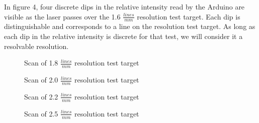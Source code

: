 \documentclass[letterpaper, 12pt]{article}
\begin{document}
\par
In figure 4, four discrete dips in the relative intensity read by the Arduino are visible as the laser passes over the 1.6 $\frac{lines}{mm}$ resolution test target. Each dip is distinguishable and corresponds to a line on the resolution test target. As long as each dip in the relative intensity is discrete for that test, we will consider it a resolvable resolution.

  \datatwo
\begin{figure}[H]
  \centering
  \caption[caption]{Scan of 1.8 $\frac{lines}{mm}$ resolution test target}
\end{figure}

  \datathree
\begin{figure}[H]
  \centering
  \caption[caption]{Scan of 2.0 $\frac{lines}{mm}$ resolution test target}
\end{figure}

  \datathree
\begin{figure}[H]
  \centering
  \caption[caption]{Scan of 2.2 $\frac{lines}{mm}$ resolution test target}
\end{figure}

  \datathree
\begin{figure}[H]
  \centering
  \caption[caption]{Scan of 2.5 $\frac{lines}{mm}$ resolution test target}
\end{figure}
\end{document}
